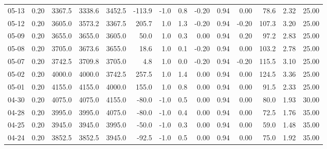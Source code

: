 \begin{threeparttable}
{\begin{tabular}{lrrrrrrrrrrrrr}
  05-13 &     0.20 & 3367.5 & 3338.6 & 3452.5 &     -113.9 &                     -1.0 &                 0.8 &      -0.20 &      0.94 &           0.00 &             78.6 &            2.32 &                  25.00 \\
  05-12 &     0.20 & 3605.0 & 3573.2 & 3367.5 &      205.7 &                      1.0 &                 1.3 &      -0.20 &      0.94 &          -0.20 &            107.3 &            3.20 &                  25.00 \\
  05-09 &     0.20 & 3655.0 & 3655.0 & 3605.0 &       50.0 &                      1.0 &                 0.3 &       0.00 &      0.94 &           0.20 &             97.2 &            2.83 &                  25.00 \\
  05-08 &     0.20 & 3705.0 & 3673.6 & 3655.0 &       18.6 &                      1.0 &                 0.1 &      -0.20 &      0.94 &           0.00 &            103.2 &            2.78 &                  25.00 \\
  05-07 &     0.20 & 3742.5 & 3709.8 & 3705.0 &        4.8 &                      1.0 &                 0.0 &      -0.20 &      0.94 &          -0.20 &            115.5 &            3.10 &                  25.00 \\
  05-02 &     0.20 & 4000.0 & 4000.0 & 3742.5 &      257.5 &                      1.0 &                 1.4 &       0.00 &      0.94 &           0.00 &            124.5 &            3.36 &                  25.00 \\
  05-01 &     0.20 & 4155.0 & 4155.0 & 4000.0 &      155.0 &                      1.0 &                 0.8 &       0.00 &      0.94 &           0.00 &             91.5 &            2.33 &                  25.00 \\
  04-30 &     0.20 & 4075.0 & 4075.0 & 4155.0 &      -80.0 &                     -1.0 &                 0.5 &       0.00 &      0.94 &           0.00 &             80.0 &            1.93 &                  30.00 \\
  04-28 &     0.20 & 3995.0 & 3995.0 & 4075.0 &      -80.0 &                     -1.0 &                 0.4 &       0.00 &      0.94 &           0.00 &             72.5 &            1.76 &                  35.00 \\
  04-25 &     0.20 & 3945.0 & 3945.0 & 3995.0 &      -50.0 &                     -1.0 &                 0.3 &       0.00 &      0.94 &           0.00 &             59.0 &            1.48 &                  35.00 \\
  04-24 &     0.20 & 3852.5 & 3852.5 & 3945.0 &      -92.5 &                     -1.0 &                 0.5 &       0.00 &      0.94 &           0.00 &             75.0 &            1.92 &                  35.00 \\

\end{tabular}}
\end{threeparttable}

